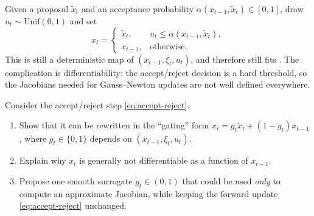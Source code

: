 \documentclass[11pt]{article}
\begin{document}
Given a proposal $\tilde x_t$ and an acceptance probability $\alpha(x_{t-1},\tilde x_t)\in[0,1]$, draw $u_t \sim \mathrm{Unif}(0,1)$ and set
\begin{equation}
  x_t =
  \begin{cases}
    \tilde x_t, & u_t \le \alpha(x_{t-1},\tilde x_t),\\
    x_{t-1}, & \text{otherwise}.
  \end{cases}
  \label{eq:accept-reject}
\end{equation}
This is still a deterministic map of $(x_{t-1},\xi_t,u_t)$, and therefore still fits .
The complication is differentiability: the accept/reject decision is a hard threshold, so the Jacobians needed for Gauss--Newton updates are not well defined everywhere.

\begin{exercise}
\label{ex:metropolis-gating}
Consider the accept/reject step \eqref{eq:accept-reject}.
\begin{enumerate}[leftmargin=*]
  \item Show that it can be rewritten in the ``gating'' form $x_t = g_t \tilde x_t + (1-g_t)x_{t-1}$, where $g_t \in \{0,1\}$ depends on $(x_{t-1},\xi_t,u_t)$.
  \item Explain why $x_{t}$ is generally not differentiable as a function of $x_{t-1}$.
  \item Propose one smooth surrogate $\tilde g_t \in (0,1)$ that could be used \emph{only} to compute an approximate Jacobian, while keeping the forward update \eqref{eq:accept-reject} unchanged.
\end{enumerate}
\end{exercise}
\end{document}

